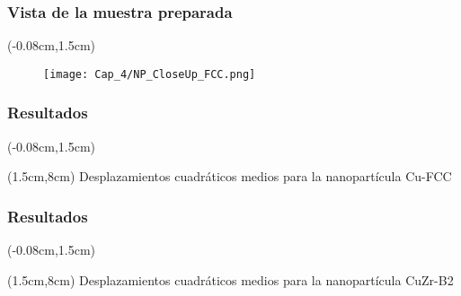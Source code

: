 \begin{frame}
 \frametitle{Vista de la muestra preparada}
 
 \begin{textblock*}{12.6cm}(-0.08cm,1.5cm) 
     \begin{figure}[htp]
	\centering
	\texttt{[image: Cap\_4/NP\_CloseUp\_FCC.png]}
      \end{figure}
  \end{textblock*}
 
\end{frame}

\begin{frame}
 \frametitle{Resultados}
 
 \begin{textblock*}{12.6cm}(-0.08cm,1.5cm) 
      \begin{figure}[htp]
	\centering
      \end{figure}
    \end{textblock*}
    \begin{textblock*}{10cm}(1.5cm,8cm) 
    \centering
      Desplazamientos cuadr\'aticos medios para la nanopart\'icula Cu-FCC
 \end{textblock*}
\end{frame}

\begin{frame}
 \frametitle{Resultados}
 
 \begin{textblock*}{12.6cm}(-0.08cm,1.5cm) 
      \begin{figure}[htp]
	\centering
      \end{figure}
    \end{textblock*}
    \begin{textblock*}{10cm}(1.5cm,8cm) 
    \centering
      Desplazamientos cuadr\'aticos medios para la nanopart\'icula CuZr-B2
 \end{textblock*}
\end{frame}

